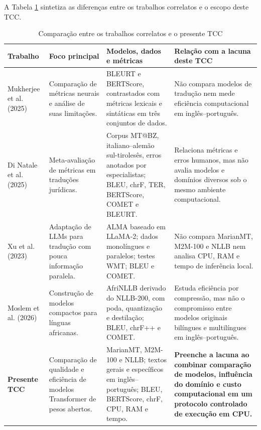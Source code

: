 A Tabela \ref{tab:trabalhos-correlatos} sintetiza as diferenças entre os trabalhos correlatos e o escopo deste TCC.

\begin{table}[H]
    \centering
    \footnotesize
    \renewcommand{\arraystretch}{1.25}
    \caption{Comparação entre os trabalhos correlatos e o presente TCC}
    \label{tab:trabalhos-correlatos}
    \begin{tabularx}{\textwidth}{>{\raggedright\arraybackslash}p{2.7cm} >{\raggedright\arraybackslash}X >{\raggedright\arraybackslash}X >{\raggedright\arraybackslash}X}
        \toprule
        \textbf{Trabalho} & \textbf{Foco principal} & \textbf{Modelos, dados e métricas} & \textbf{Relação com a lacuna deste TCC} \\
        \midrule
        Mukherjee et al. (2025) & Comparação de métricas neurais e análise de suas limitações. & BLEURT e BERTScore, contrastados com métricas lexicais e sintáticas em três conjuntos de dados. & Não compara modelos de tradução nem mede eficiência computacional em inglês--português. \\
        \addlinespace
        Di Natale et al. (2025) & Meta-avaliação de métricas em traduções jurídicas. & Corpus MT@BZ, italiano--alemão sul-tirolesês, erros anotados por especialistas; BLEU, chrF, TER, BERTScore, COMET e BLEURT. & Relaciona métricas e erros humanos, mas não avalia modelos e domínios diversos sob o mesmo ambiente computacional. \\
        \addlinespace
        Xu et al. (2023) & Adaptação de LLMs para tradução com pouca informação paralela. & ALMA baseado em LLaMA-2; dados monolíngues e paralelos; testes WMT; BLEU e COMET. & Não compara MarianMT, M2M-100 e NLLB nem analisa CPU, RAM e tempo de inferência local. \\
        \addlinespace
        Moslem et al. (2026) & Construção de modelos compactos para línguas africanas. & AfriNLLB derivado do NLLB-200, com poda, quantização e destilação; BLEU, chrF++ e COMET. & Estuda eficiência por compressão, mas não o compromisso entre modelos originais bilíngues e multilíngues em inglês--português. \\
        \addlinespace
        \textbf{Presente TCC} & Comparação de qualidade e eficiência de modelos Transformer de pesos abertos. & MarianMT, M2M-100 e NLLB; textos gerais e específicos em inglês--português; BLEU, BERTScore, chrF, CPU, RAM e tempo. & \textbf{Preenche a lacuna ao combinar comparação de modelos, influência do domínio e custo computacional em um protocolo controlado de execução em CPU.} \\
        \bottomrule
    \end{tabularx}
\end{table}

